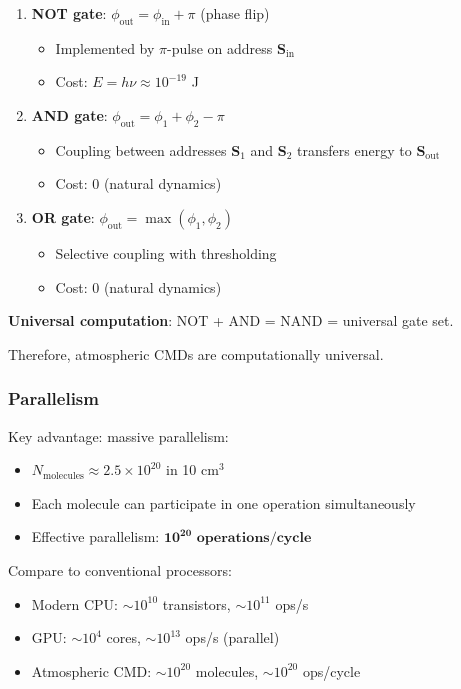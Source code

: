 \begin{enumerate}
\item \textbf{NOT gate}: $\phi_{\text{out}} = \phi_{\text{in}} + \pi$ (phase flip)
\begin{itemize}
\item Implemented by $\pi$-pulse on address $\mathbf{S}_{\text{in}}$
\item Cost: $E = h\nu \approx 10^{-19}$ J
\end{itemize}

\item \textbf{AND gate}: $\phi_{\text{out}} = \phi_1 + \phi_2 - \pi$
\begin{itemize}
\item Coupling between addresses $\mathbf{S}_1$ and $\mathbf{S}_2$ transfers energy to $\mathbf{S}_{\text{out}}$
\item Cost: 0 (natural dynamics)
\end{itemize}

\item \textbf{OR gate}: $\phi_{\text{out}} = \max(\phi_1, \phi_2)$
\begin{itemize}
\item Selective coupling with thresholding
\item Cost: 0 (natural dynamics)
\end{itemize}
\end{enumerate}

\textbf{Universal computation}: NOT + AND = NAND = universal gate set.

Therefore, atmospheric CMDs are computationally universal.

\subsubsection{Parallelism}

Key advantage: massive parallelism:

\begin{itemize}
\item $N_{\text{molecules}} \approx 2.5 \times 10^{20}$ in 10 cm$^3$
\item Each molecule can participate in one operation simultaneously
\item Effective parallelism: $\mathbf{10^{20} \text{ operations/cycle}}$
\end{itemize}

Compare to conventional processors:
\begin{itemize}
\item Modern CPU: $\sim 10^{10}$ transistors, $\sim 10^{11}$ ops/s
\item GPU: $\sim 10^4$ cores, $\sim 10^{13}$ ops/s (parallel)
\item Atmospheric CMD: $\sim 10^{20}$ molecules, $\sim 10^{20}$ ops/cycle
\end{itemize}

